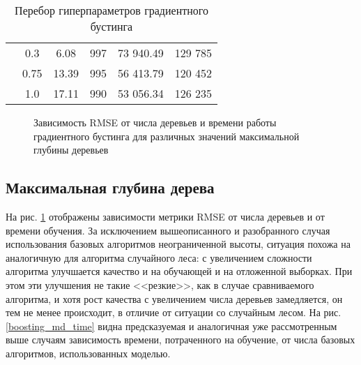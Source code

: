 \documentclass[a4paper, 14pt]{article}
\begin{document}
\begin{table}[]
\begin{tabular}{@{}cc|cccc@{}}
                                                                                    & 0.3                                                     & 6.08     & 997            & 73 940.49                                                            & 129 785                                                                \\
                                                                                    & 0.75                                                    & 13.39    & 995            & 56 413.79                                                            & 120 452                                                                \\
                                                                                    & 1.0                                                     & 17.11    & 990            & 53 056.34                                                            & 126 235                                                                \\ \bottomrule
    \end{tabular}
    \caption{Перебор гиперпараметров градиентного бустинга}\label{boosting_hyper}
    \end{table}

    \begin{figure}[H]
      \centering
      
      \caption{Зависимость RMSE от числа деревьев и времени работы градиентного бустинга для различных значений максимальной глубины деревьев}\label{boosting_md}
    \end{figure}

\subsection{Максимальная глубина дерева}
    На рис. \ref{boosting_md} отображены зависимости метрики RMSE от числа деревьев и от времени обучения. За исключением вышеописанного и разобранного случая использования базовых алгоритмов неограниченной высоты, ситуация похожа на аналогичную для алгоритма случайного леса: с увеличением сложности алгоритма улучшается качество и на обучающей и на отложенной выборках. При этом эти улучшения не такие <<резкие>>, как в случае сравниваемого алгоритма, и хотя рост качества с увеличением числа деревьев замедляется, он тем не менее происходит, в отличие от ситуации со случайным лесом. На рис. \ref{boosting_md_time} видна предсказуемая и аналогичная уже рассмотренным выше случаям зависимость времени, потраченного на обучение, от числа базовых алгоритмов, использованных моделью.
    
\end{document}
